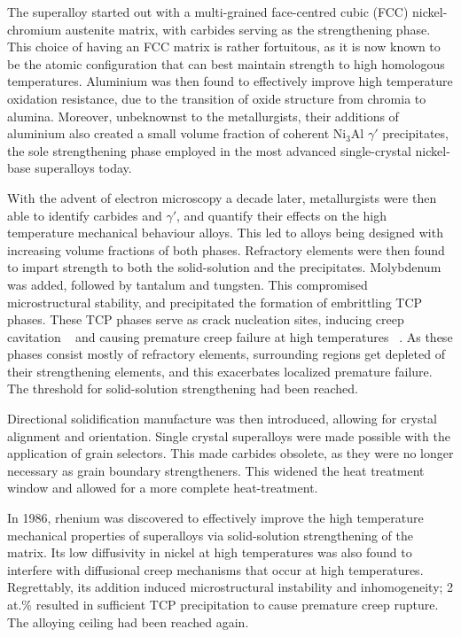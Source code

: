 %
The superalloy started out with a multi-grained face-centred cubic (FCC) nickel-chromium austenite matrix, with carbides serving as the strengthening phase.  This choice of having an FCC matrix is rather fortuitous, as it is now known to be the atomic configuration that can best maintain strength to high homologous temperatures.  Aluminium was then found to effectively improve high temperature oxidation resistance, due to the transition of oxide structure from chromia to alumina.  Moreover, unbeknownst to the metallurgists, their additions of aluminium also created a small volume fraction of coherent Ni$_3$Al $\gamma'$ precipitates, the sole strengthening phase employed in the most advanced single-crystal nickel-base superalloys today. 

With the advent of electron microscopy a decade later, metallurgists were then able to identify carbides and $\gamma'$, and quantify their effects on the high temperature mechanical behaviour alloys.  This led to alloys being designed with increasing volume fractions of both phases.  Refractory elements were then found to impart strength to both the solid-solution and the precipitates.  Molybdenum was added, followed by tantalum and tungsten.  This compromised microstructural stability, and precipitated the formation of embrittling TCP phases.  These TCP phases serve as crack nucleation sites, inducing creep cavitation ~\cite{reed99} and causing premature creep failure at high temperatures ~\cite{yeh04}.  As these phases consist mostly of refractory elements, surrounding regions get depleted of their strengthening elements, and this exacerbates localized premature failure.  The threshold for solid-solution strengthening had been reached. 

Directional solidification manufacture was then introduced, allowing for crystal alignment and orientation.  Single crystal superalloys were made possible with the application of grain selectors.  This made carbides obsolete, as they were no longer necessary as grain boundary strengtheners.  This widened the heat treatment window and allowed for a more complete heat-treatment. 

In 1986, rhenium was discovered to effectively improve the high temperature mechanical properties of superalloys via solid-solution strengthening of the matrix.  Its low diffusivity in nickel at high temperatures was also found to interfere with diffusional creep mechanisms that occur at high temperatures.  Regrettably, its addition induced microstructural instability and inhomogeneity; 2 at.\% resulted in sufficient TCP precipitation to cause premature creep rupture.  The alloying ceiling had been reached again. 

